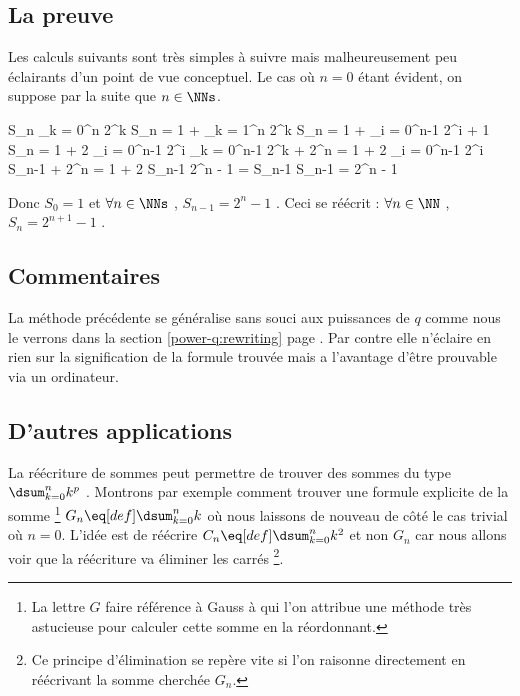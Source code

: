 \subsection{La preuve}

Les calculs suivants sont très simples à suivre mais malheureusement peu éclairants d'un point de vue conceptuel. Le cas où $n = 0$ étant évident, on suppose par la suite que $n \in \NNs$.

\begin{focusproof}
\begin{stepcalc}[style = sar, ope = \iff]
	S_n \eq[def] \dsum_{k = 0}^{n} 2^k
		\explnext{}
	S_n = 1 + \dsum_{k = 1}^{n} 2^k
	S_n = 1 + \dsum_{i = 0}^{n-1} 2^{i + 1}
		\explnext{}
	S_n = 1 + 2 \dsum_{i = 0}^{n-1} 2^i
	\dsum_{k = 0}^{n-1} 2^k + 2^n = 1 + 2 \dsum_{i = 0}^{n-1} 2^i
		\explnext{}
	S_{n-1} + 2^n = 1 + 2 S_{n-1}
		\explnext{}
	2^n - 1 = S_{n-1}
		\explnext{}
	S_{n-1} = 2^n - 1
\end{stepcalc}

\medskip

Donc $S_0 = 1$ et $\forall n \in \NNs$ , $S_{n-1} = 2^n - 1$ .
Ceci se réécrit :
$\forall n \in \NN$ , $S_n = 2^{n+1} - 1$ .
\end{focusproof}




\subsection{Commentaires}

La méthode précédente se généralise sans souci aux puissances de $q$ comme nous le verrons dans la section \ref{power-q:rewriting} page \pageref{power-q:rewriting}.
Par contre elle n'éclaire en rien sur la signification de la formule trouvée mais a l'avantage d'être prouvable via un ordinateur.




\subsection{D'autres applications}

La réécriture de sommes peut permettre de trouver des sommes du type $\dsum_{k = 0}^{n} k^p$ .
Montrons par exemple comment trouver une formule explicite de la somme
\footnote{
	La lettre $G$ faire référence à Gauss à qui l'on attribue une méthode très astucieuse pour calculer cette somme en la réordonnant.
}
$G_n \eq[def] \dsum_{k = 0}^{n} k$ où nous laissons de nouveau de côté le cas trivial où $n = 0$.
L'idée est de réécrire $C_n \eq[def] \dsum_{k = 0}^{n} k^2$ et non $G_n$ car nous allons voir que la réécriture va éliminer les carrés
\footnote{
	Ce principe d'élimination se repère vite si l'on raisonne directement en réécrivant la somme cherchée $G_n$.
}.


